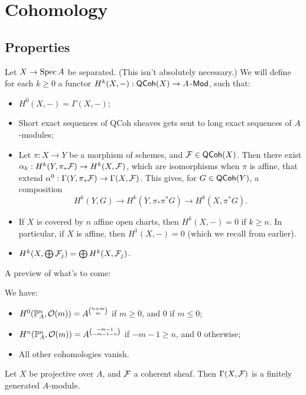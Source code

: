\documentclass[11pt]{amsart}
\begin{document}
\section{Cohomology}

\subsection{Properties}

Let $X\to \operatorname{Spec} A$ be separated. (This isn't absolutely necessary.) We will define for each $k\ge 0$ a functor $H^k(X,-): \mathsf{QCoh}(X) \to A$-$\mathsf{Mod}$, such that:
\begin{itemize}
    \item $H^0(X,-) = \Gamma(X, -)$;
    \item Short exact sequences of QCoh sheaves gets sent to long exact sequences of $A$-modules;
    \item Let $\pi:X\to Y$ be a morphism of schemes, and $\mathcal{F}\in \mathsf{QCoh}(X)$. Then there exist $\alpha_k: H^k(Y, \pi_\ast \mathcal{F}) \to H^k(X, \mathcal{F})$, which are isomorphisms when $\pi$ is affine, that extend $\alpha^0: \Gamma(Y, \pi_\ast \mathcal{F}) \to \Gamma(X, \mathcal{F})$. This gives, for $G\in \mathsf{QCoh}(Y)$, a composition 
    \[H^k(Y,G) \to H^k(Y, \pi_\ast \pi^\ast G) \to H^k(X, \pi^\ast G).\]

    \item If $X$ is covered by $n$ affine open charts, then $H^k(X,-) = 0$ if $k\ge n$. In particular, if $X$ is affine, then $H^1(X,-) = 0$ (which we recall from earlier).
    \item $H^k(X, \bigoplus \mathcal{F}_j) = \bigoplus H^k(X,\mathcal{F}_j)$.
\end{itemize}

A preview of what's to come:


\begin{thm}[cohomologies of $\cO(m)$]
    We have:
    \begin{itemize}
        \item $H^0(\mathbb{P}^n_A, \mathcal{O}(m)) = A^{\binom{n+m}{m}}$ if $m\ge 0$, and 0 if $m\le 0$;
        \item $H^n(\mathbb{P}^n_A, \mathcal{O}(m)) = A^{\binom{-m-1}{-m-1-n}}$ if $-m-1\ge n$, and 0 otherwise;
        \item All other cohomologies vanish.
    \end{itemize}
\end{thm}

\begin{thm}
    Let $X$ be projective over $A$, and $\mathcal{F}$ a coherent sheaf. Then $\Gamma(X,\mathcal{F})$ is a finitely generated $A$-module.
\end{thm}
\end{document}

